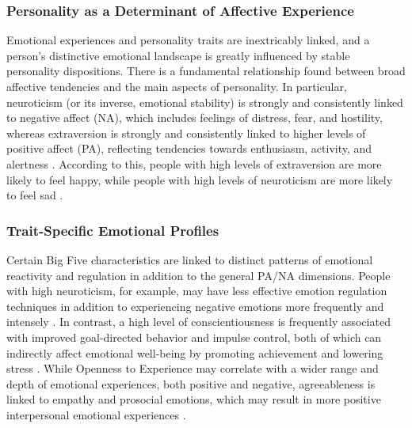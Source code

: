 \documentclass{DESSThesis}
\begin{document}
\subsubsection{Personality as a Determinant of Affective Experience}
Emotional experiences and personality traits are inextricably linked, and a person's distinctive emotional landscape is greatly influenced by stable personality dispositions. There is a fundamental relationship found between broad affective tendencies and the main aspects of personality. In particular, neuroticism (or its inverse, emotional stability) is strongly and consistently linked to negative affect (NA), which includes feelings of distress, fear, and hostility, whereas extraversion is strongly and consistently linked to higher levels of positive affect (PA), reflecting tendencies towards enthusiasm, activity, and alertness \cite{david_watson_panas-x_1994,oshio_resilience_2018}. According to this, people with high levels of extraversion are more likely to feel happy, while people with high levels of neuroticism are more likely to feel sad \cite{david_watson_panas-x_1994}.

\subsubsection{Trait-Specific Emotional Profiles}
Certain Big Five characteristics are linked to distinct patterns of emotional reactivity and regulation in addition to the general PA/NA dimensions. People with high neuroticism, for example, may have less effective emotion regulation techniques in addition to experiencing negative emotions more frequently and intensely \cite{oshio_resilience_2018,cobb-clark_stability_2012}. In contrast, a high level of conscientiousness is frequently associated with improved goal-directed behavior and impulse control, both of which can indirectly affect emotional well-being by promoting achievement and lowering stress \cite{oshio_resilience_2018}. While Openness to Experience may correlate with a wider range and depth of emotional experiences, both positive and negative, agreeableness is linked to empathy and prosocial emotions, which may result in more positive interpersonal emotional experiences \cite{oshio_resilience_2018}.
\end{document}
